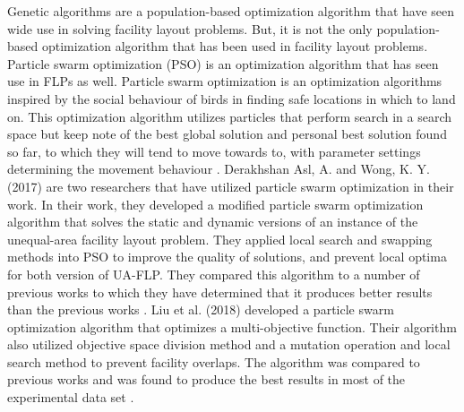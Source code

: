 Genetic algorithms are a population-based optimization algorithm that have seen wide use in solving facility layout problems. But, it is not the only population-based optimization algorithm that has been used in facility layout problems. Particle swarm optimization (PSO) is an optimization algorithm that has seen use in FLPs as well. Particle swarm optimization is an optimization algorithms inspired by the social behaviour of birds in finding safe locations in which to land on. This optimization algorithm utilizes particles that perform search in a search space but keep note of the best global solution and personal best solution found so far, to which they will tend to move towards to, with parameter settings determining the movement behaviour \cite{SeixasGomesdeAlmeida2019}. Derakhshan Asl, A. and Wong, K. Y. (2017) are two researchers that have utilized particle swarm optimization in their work. In their work, they developed a modified particle swarm optimization algorithm that solves the static and dynamic versions of an instance of the unequal-area facility layout problem. They applied local search and swapping methods into PSO to improve the quality of solutions, and prevent local optima for both version of UA-FLP. They compared this algorithm to a number of previous works to which they have determined that it produces better results than the previous works \cite{DerakhshanAsl2017}. Liu et al. (2018) developed a particle swarm optimization algorithm that optimizes a multi-objective function. Their algorithm also utilized objective space division method and a mutation operation and local search method to prevent facility overlaps. The algorithm was compared to previous works and was found to produce the best results in most of the experimental data set \cite{Liu2018}.

